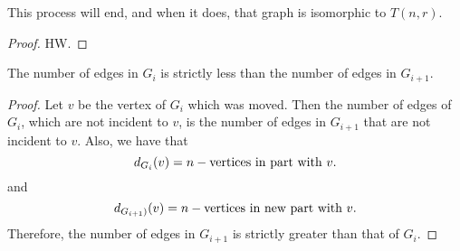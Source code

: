 \begin{lemma}
	This process will end, and when it does, that graph is isomorphic to \( T(n, r) \).
\end{lemma}
\begin{proof}
	HW.
\end{proof}

\begin{lemma}
	The number of edges in \( G_i \) is strictly less than the number of edges in \( G_{i+1} \).
\end{lemma}
\begin{proof}
	Let \( v \) be the vertex of \( G_i \) which was moved. Then the number of edges of \( G_i \), which are not incident to \( v \), is the number of edges in \( G_{i+1}  \) that are not incident to \( v \). Also, we have that \[
		d_{G_i}(v) = n - \text{vertices in part with \( v \)}
	.\] and \[
		d_{G_{i+1})}(v) = n - \text{vertices in new part with \( v \)}
	.\] Therefore, the number of edges in \( G_{i+1} \) is strictly greater than that of \( G_i \).
\end{proof}
